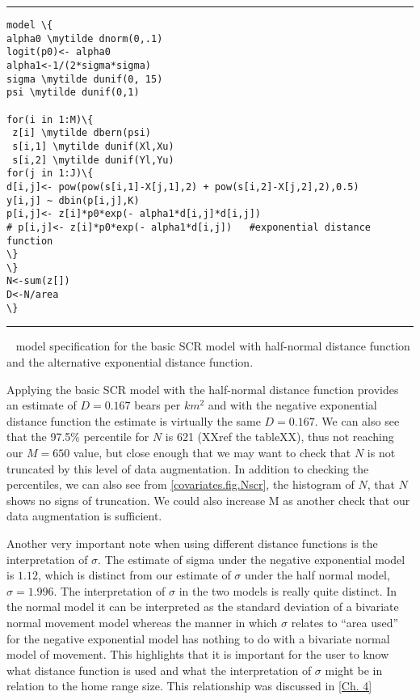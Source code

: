 \begin{panel}[htp]
\centering
\rule[0.1in]{\textwidth}{.03in}
{\small
\begin{Verbatim}[commandchars=\\\{\}]
model \{
alpha0 \mytilde dnorm(0,.1)
logit(p0)<- alpha0
alpha1<-1/(2*sigma*sigma)
sigma \mytilde dunif(0, 15)
psi \mytilde dunif(0,1)

for(i in 1:M)\{
 z[i] \mytilde dbern(psi)
 s[i,1] \mytilde dunif(Xl,Xu)
 s[i,2] \mytilde dunif(Yl,Yu)
for(j in 1:J)\{
d[i,j]<- pow(pow(s[i,1]-X[j,1],2) + pow(s[i,2]-X[j,2],2),0.5)
y[i,j] ~ dbin(p[i,j],K)
p[i,j]<- z[i]*p0*exp(- alpha1*d[i,j]*d[i,j])
# p[i,j]<- z[i]*p0*exp(- alpha1*d[i,j])   #exponential distance function
\}
\}
N<-sum(z[])
D<-N/area
\}

\end{Verbatim}
}

\rule[-0.1in]{\textwidth}{.03in}
\caption{
\jags~ model specification for the basic SCR model with half-normal distance
function and the alternative exponential distance function.}
\label{covariates.panel.basicSCR}
\end{panel}

Applying the basic SCR model with the half-normal
distance function provides an estimate of $D = 0.167$ bears per $km^2$ and with the
negative exponential distance function the estimate is virtually the 
same $D = 0.167$.   We can also see that the 97.5\%
percentile for $N$ is 621 (XXref the tableXX), thus not reaching our $M=650$ value, but
close enough that we may want to check that $N$ is not truncated by
this level of data augmentation.  In addition to checking the percentiles, 
we can also see from \ref{covariates.fig.Nscr}, the histogram of $N$, that $N$ 
shows no signs of truncation.  We could also increase
M as another check that our data augmentation is sufficient.

Another very important note when using different distance functions is the
interpretation of $\sigma$.  The estimate of sigma under the negative exponential model is
$1.12$, which is distinct from our
estimate of $\sigma$ under the half normal model, $\sigma = 1.996$.
The interpretation
of $\sigma$ in the two models is really quite distinct. In the normal
model it can be interpreted as the standard deviation of a bivariate
normal movement model whereas the manner in which $\sigma$ relates to
``area used'' for the negative exponential model has nothing to do
with a bivariate normal model of movement.  This highlights that it is
important for the user to know what distance function is used and what
the interpretation of $\sigma$ might be in relation to the home range size.
This relationship was discussed in \ref{Ch. 4}


